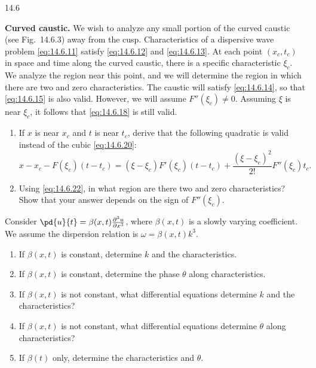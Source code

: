 \begin{exercises}{14.6}
\item \textbf{Curved caustic.}  We wish to analyze any small portion of the curved caustic (see Fig.~14.6.3) away from the cusp.  Characteristics of a dispersive wave problem \eqref{eq:14.6.11} satisfy \eqref{eq:14.6.12} and \eqref{eq:14.6.13}.  At each point $(x_c, t_c)$ in space and time along the curved caustic, there is a specific characteristic $\xi_c$.  We analyze the region near this point, and we will determine the region in which there are two and zero characteristics.  The caustic will satisfy \eqref{eq:14.6.14}, so that \eqref{eq:14.6.15} is also valid.  However, we will assume $F''(\xi_c) \neq 0$.  Assuming $\xi$ is near $\xi_c$, it follows that \eqref{eq:14.6.18} is still valid.
\begin{enumerate}
\item[(a)] If $x$ is near $x_c$ and $t$ is near $t_c$, derive that the following quadratic is valid instead of the cubic \eqref{eq:14.6.20}:
\begin{equation}
\label{eq:14.6.22}
x - x_c - F(\xi_c)(t - t_c) = (\xi - \xi_c)F'(\xi_c)(t - t_c) + \frac{(\xi-\xi_c)^2}{2!}F''(\xi_c)t_c.
\end{equation}
\item[(b)] Using \eqref{eq:14.6.22}, in what region are there two and zero characteristics?  Show that your answer depends on the sign of $F''(\xi_c)$.
\end{enumerate}

\item Consider $\pd{u}{t} = \beta(x,t)\frac{\partial^3 u}{\partial x^3}$, where $\beta(x,t)$ is a slowly varying coefficient.  We assume the dispersion relation is $\omega = \beta(x,t)k^3$.
\begin{enumerate}
\item[(a)] If $\beta(x,t)$ is constant, determine $k$ and the characteristics.
\item[(b)] If $\beta(x,t)$ is constant, determine the phase $\theta$ along characteristics.
\item[(c)] If $\beta(x,t)$ is not constant, what differential equations determine $k$ and the characteristics?
\item[(d)] If $\beta(x,t)$ is not constant, what differential equations determine $\theta$ along characteristics?
\item[(e)] If $\beta(t)$ only, determine the characteristics and $\theta$.
\end{enumerate}
\end{exercises}
